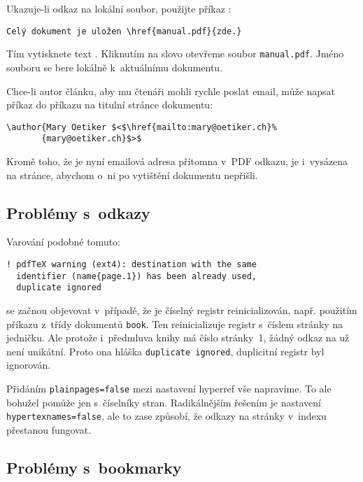 Ukazuje-li odkaz na lokální soubor, použijte příkaz :
\begin{code}
\begin{verbatim}
Celý dokument je uložen \href{manual.pdf}{zde.}
\end{verbatim}
\end{code}
Tím vytisknete text .
Kliknutím na slovo \uv{\textcolor{cyan}{zde.}} otevřeme soubor
\texttt{manual.pdf}. Jméno souboru se bere lokálně k~aktuálnímu dokumentu.

Chce-li autor článku, aby mu čtenáři mohli rychle poslat email, může
  napsat příkaz  do příkazu  na titulní stránce
  dokumentu:
\begin{code}
\begin{verbatim}
\author{Mary Oetiker $<$\href{mailto:mary@oetiker.ch}%
       {mary@oetiker.ch}$>$
\end{verbatim}
\end{code}
Kromě toho, že je nyní emailová adresa přítomna v~PDF odkazu, je i~vysázena
na stránce, abychom o~ni po vytištění dokumentu nepřišli.

\subsection{Problémy s~odkazy}

Varování podobné tomuto:
\begin{verbatim}
! pdfTeX warning (ext4): destination with the same
  identifier (name{page.1}) has been already used,
  duplicate ignored
\end{verbatim}
se začnou objevovat v~případě, že je číselný registr reinicializován,
např. použitím příkazu  z~třídy dokumentů
\texttt{book}. Ten reinicializuje registr s~číslem stránky na jedničku.
Ale protože i~předmluva knihy má číslo stránky~1, žádný odkaz
na  už není unikátní. Proto ona hláška
\verb+duplicate ignored+, duplicitní registr byl ignorován.

Přidáním \texttt{plainpages=false} mezi nastavení hyperref vše napravíme.
To ale bohužel pomůže jen s~číselníky stran.
Radikálnějším řešením je nastavení \texttt{hypertexnames=false},
ale to zase způsobí, že odkazy na stránky v~indexu přestanou fungovat.

\subsection{Problémy s~bookmarky}

